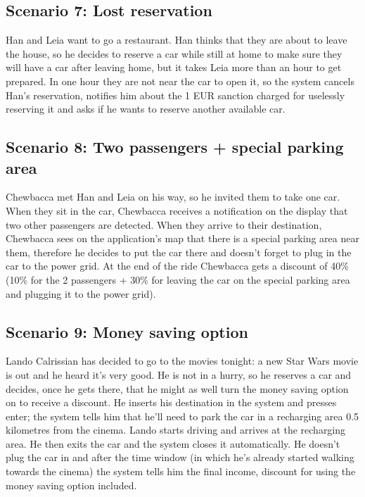 \subsection{Scenario 7: Lost reservation}
	Han and Leia want to go a restaurant. Han thinks that they are about to leave the house, so he decides to reserve a car while still at home to make sure they will have a car after leaving home, but it takes Leia more than an hour to get prepared. In one hour they are not near the car to open it, so the system cancels Han's reservation, notifies him about the 1 EUR sanction charged for uselessly reserving it and asks if he wants to reserve another available car.    	
	
\subsection{Scenario 8: Two passengers + special parking area}
	Chewbacca met Han and Leia on his way, so he invited them to take one car. When they sit in the car, Chewbacca receives a notification on the display that two other passengers are detected. When they arrive to their destination, Chewbacca sees on the application's map that there is a special parking area near them, therefore he decides to put the car there and doesn't forget to plug in the car to the power grid. At the end of the ride Chewbacca gets a discount of 40\% (10\% for the 2 passengers + 30\% for leaving the car on the special parking area and plugging it to the power grid).  
	
\subsection{Scenario 9: Money saving option}
	Lando Calrissian has decided to go to the movies tonight: a new Star Wars movie is out and he heard it's very good. He is not in a hurry, so he reserves a car and decides, once he gets there, that he might as well turn the money saving option on to receive a discount. He inserts his destination in the system and presses enter; the system tells him that he'll need to park the car in a recharging area 0.5 kilometres from the cinema. Lando starts driving and arrives at the recharging area. He then exits the car and the system closes it automatically. He doesn't plug the car in and after the time window (in which he's already started walking towards the cinema) the system tells him the final income, discount for using the money saving option included.

